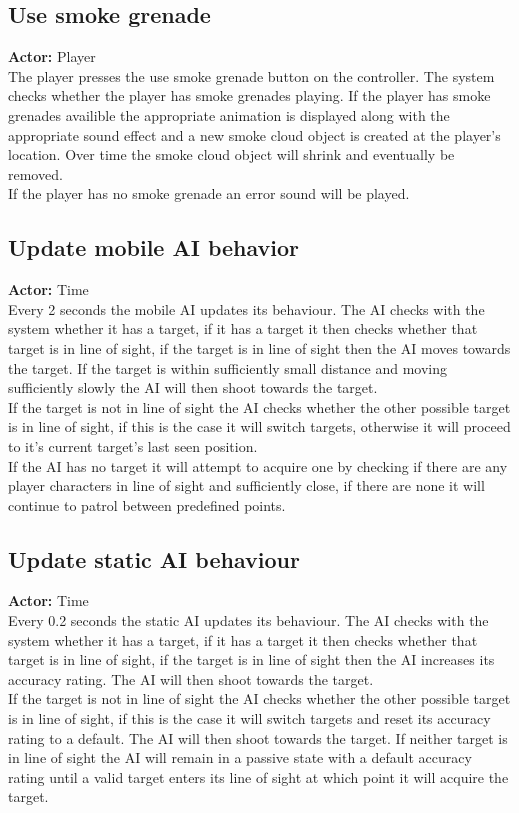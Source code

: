 \documentclass[a4paper,10pt]{article}
\begin{document}
\subsection{Use smoke grenade}
\textbf{Actor:} Player\smallskip\\
The player presses the use smoke grenade button on the controller. The system checks whether the player has smoke grenades playing. If the player has smoke grenades availible the appropriate animation is displayed along with the appropriate sound effect and a new smoke cloud object is created at the player's location. Over time the smoke cloud object will shrink and eventually be removed.\smallskip\\
If the player has no smoke grenade an error sound will be played.

\subsection{Update mobile AI behavior}
\textbf{Actor:} Time\smallskip\\
Every 2 seconds the mobile AI updates its behaviour. The AI checks with the system whether it has a target, if it has a target it then checks whether that target is in line of sight, if the target is in line of sight then the AI moves towards the target. If the target is within sufficiently small distance and moving sufficiently slowly the AI will then shoot towards the target.\smallskip\\
If the target is not in line of sight the AI checks whether the other possible target is in line of sight, if this is the case it will switch targets, otherwise it will proceed to it's current target's last seen position.\smallskip\\
If the AI has no target it will attempt to acquire one by checking if there are any player characters in line of sight and sufficiently close, if there are none it will continue to patrol between predefined points.

\subsection{Update static AI behaviour}
\textbf{Actor:} Time\smallskip\\
Every 0.2 seconds the static AI updates its behaviour. The AI checks with the system whether it has a target, if it has a target it then checks whether that target is in line of sight, if the target is in line of sight then the AI increases its accuracy rating. The AI will then shoot towards the target.\smallskip\\
If the target is not in line of sight the AI checks whether the other possible target is in line of sight, if this is the case it will switch targets and reset its accuracy rating to a default. The AI will then shoot towards the target. If neither target is in line of sight the AI will remain in a passive state with a default accuracy rating until a valid target enters its line of sight at which point it will acquire the target.
\end{document}
